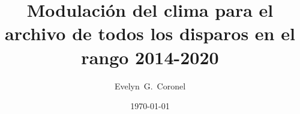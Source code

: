 



\title{Modulación del clima para el archivo de todos los disparos en el rango 2014-2020}
\author{Evelyn~G.~Coronel}


\date[]{\lowercase{\today}} %


\maketitle





